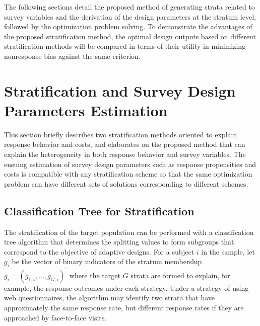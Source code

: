 \documentclass[12pt]{article}
\begin{document}

The following sections detail the proposed method of generating strata related to survey variables and the derivation of the design parameters at the stratum level, followed by the optimization problem solving.
To demonstrate the advantages of the proposed stratification method, the optimal design outputs based on different stratification methods will be compared in terms of their utility in minimizing nonresponse bias against the same criterion.


\section{Stratification and Survey Design Parameters Estimation}
\label{sec:stratification-survey-design-parameters-estimation}

This section briefly describes two stratification methods oriented to explain response behavior and costs, and elaborates on the proposed method that can explain the heterogeneity in both response behavior and survey variables.
The ensuing estimation of survey design parameters such as response propensities and costs is compatible with any stratification scheme so that the same optimization problem can have different sets of solutions corresponding to different schemes.

\subsection{Classification Tree for Stratification}
\label{subsec:classification-tree-stratification}

The stratification of the target population can be performed with a classification tree algorithm that determines the splitting values to form subgroups that correspond to the objective of adaptive designs.
For a subject $i$ in the sample, let $g_i$ be the vector of binary indicators of the stratum membership $g_i=(g_{1,i},\dots,g_{G,i})^{'}$
where the target $G$ strata are formed to explain, for example, the response outcomes under each strategy.
Under a strategy of using web questionnaires, the algorithm may identify two strata that have approximately the same response rate, but different response rates if they are approached by face-to-face visits.
\end{document}
